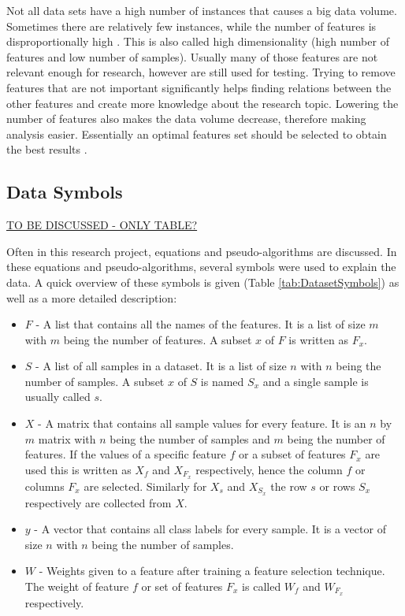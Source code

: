 \documentclass[10pt,a4paper]{report}
\begin{document}
	Not all data sets have a high number of instances that causes a big data volume. Sometimes there are relatively few instances, while the number of features is disproportionally high \cite{dubitzky2007fundamentals}. This is also called high dimensionality (high number of features and low number of samples). Usually many of those features are not relevant enough for research, however are still used for testing. Trying to remove features that are not important significantly helps finding relations between the other features and create more knowledge about the research topic. Lowering the number of features also makes the data volume decrease, therefore making analysis easier. Essentially an optimal features set should be selected to obtain the best results \cite{PENG201015}.	
	
	\subsection{Data Symbols}  \underline{TO BE DISCUSSED - ONLY TABLE?}
	\label{subsec:DataSymbols}
	
	Often in this research project, equations and pseudo-algorithms are discussed. In these equations and pseudo-algorithms, several symbols were used to explain the data. A quick overview of these symbols is given (Table \ref{tab:DatasetSymbols}) as well as a more detailed description:
	
	\begin{itemize}
		\item \textit{$F$} -
		A list that contains all the names of the features. It is a list of size $m$ with $m$ being the number of features. A subset $x$ of $F$ is written as $F_x$.
		\item \textit{$S$} -  
		A list of all samples in a dataset. It is a list of size $n$ with $n$ being the number of samples. A subset $x$ of $S$ is named $S_x$ and a single sample is usually called $s$. 
		\item \textit{$X$} -
		A matrix that contains all sample values for every feature. It is an $n$ by $m$ matrix with $n$ being the number of samples and $m$ being the number of features. If the values of a specific feature $f$ or a subset of features $F_x$ are used this is written as $X_f$ and $X_{F_x}$ respectively, hence the column $f$ or columns $F_x$ are selected. Similarly for $X_s$ and $X_{S_x}$ the row $s$ or rows $S_x$ respectively are collected from $X$.
		\item \textit{$y$} -
		A vector that contains all class labels for every sample. It is a vector of size $n$ with $n$ being the number of samples.
		\item \textit{$W$} - 
		Weights given to a feature after training a feature selection technique. The weight of feature $f$ or set of features $F_x$ is called $W_f$ and $W_{F_x}$ respectively.
	\end{itemize}
	
\end{document}
